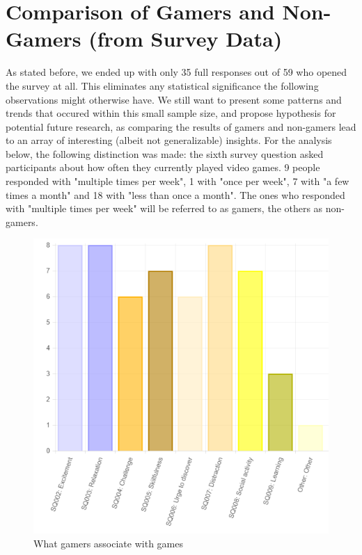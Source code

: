\documentclass[]{vutinfth}
\begin{document}
\hypertarget{comparison-of-gamers-and-non-gamers-from-survey-data}{%
\section{Comparison of Gamers and Non-Gamers (from Survey
Data)}\label{comparison-of-gamers-and-non-gamers-from-survey-data}}

As stated before, we ended up with only 35 full responses out of 59 who
opened the survey at all. This eliminates any statistical significance
the following observations might otherwise have. We still want to
present some patterns and trends that occured within this small sample
size, and propose hypothesis for potential future research, as comparing
the results of gamers and non-gamers lead to an array of interesting
(albeit not generalizable) insights. For the analysis below, the
following distinction was made: the sixth survey question asked
participants about how often they currently played video games. 9 people
responded with "multiple times per week", 1 with "once per week", 7 with
"a few times a month" and 18 with "less than once a month". The ones who
responded with "multiple times per week" will be referred to as gamers,
the others as non-gamers.

\begin{figure}
\centering
\includegraphics{images/gamer-interests.png}
\caption{What gamers associate with games}
\end{figure}
\end{document}
